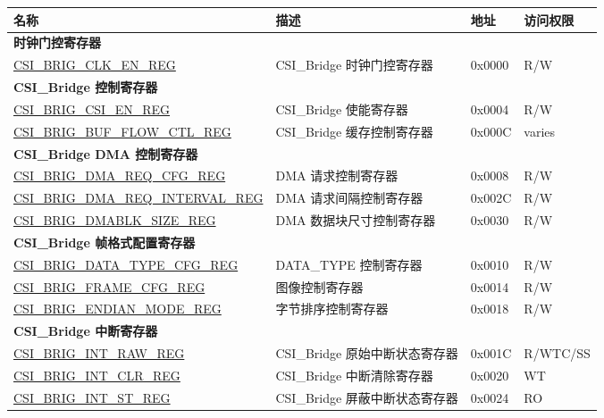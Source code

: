 \begin{longtable}{ | p{6cm} | p{7.2cm} | p{1.3cm} | p{1cm} | }
\hline\rowcolor{lightgray}
\textbf{名称} & \textbf{描述} &  \textbf{地址} & \textbf{访问权限} \\ \hline
\endhead
\multicolumn{4}{|l|}{\textbf{时钟门控寄存器}} \\ \hline
\hyperref[regdesc:CSIBRIGCLKENREG]{CSI\_BRIG\_CLK\_EN\_REG} & CSI\_Bridge 时钟门控寄存器 & 0x0000 & R/W \\ \hline

\multicolumn{4}{|l|}{\textbf{CSI\_Bridge 控制寄存器}} \\ \hline
\hyperref[regdesc:CSIBRIGCSIENREG]{CSI\_BRIG\_CSI\_EN\_REG} & CSI\_Bridge 使能寄存器 & 0x0004 & R/W \\ \hline
\hyperref[regdesc:CSIBRIGBUFFLOWCTLREG]{CSI\_BRIG\_BUF\_FLOW\_CTL\_REG} & CSI\_Bridge 缓存控制寄存器 & 0x000C & varies \\ \hline
\multicolumn{4}{|l|}{\textbf{CSI\_Bridge DMA 控制寄存器}} \\ \hline
\hyperref[regdesc:CSIBRIGDMAREQCFGREG]{CSI\_BRIG\_DMA\_REQ\_CFG\_REG} & DMA 请求控制寄存器 & 0x0008 & R/W \\ \hline
\hyperref[regdesc:CSIBRIGDMAREQINTERVALREG]{CSI\_BRIG\_DMA\_REQ\_INTERVAL\_REG} & DMA 请求间隔控制寄存器 & 0x002C & R/W \\ \hline
\hyperref[regdesc:CSIBRIGDMABLKSIZEREG]{CSI\_BRIG\_DMABLK\_SIZE\_REG} & DMA 数据块尺寸控制寄存器 & 0x0030 & R/W \\ \hline
\multicolumn{4}{|l|}{\textbf{CSI\_Bridge 帧格式配置寄存器}} \\ \hline
\hyperref[regdesc:CSIBRIGDATATYPECFGREG]{CSI\_BRIG\_DATA\_TYPE\_CFG\_REG} & DATA\_TYPE 控制寄存器 & 0x0010 & R/W \\ \hline
\hyperref[regdesc:CSIBRIGFRAMECFGREG]{CSI\_BRIG\_FRAME\_CFG\_REG} & 图像控制寄存器 & 0x0014 & R/W \\ \hline
\hyperref[regdesc:CSIBRIGENDIANMODEREG]{CSI\_BRIG\_ENDIAN\_MODE\_REG} & 字节排序控制寄存器 & 0x0018 & R/W \\ \hline
\multicolumn{4}{|l|}{\textbf{CSI\_Bridge 中断寄存器}} \\ \hline
\hyperref[regdesc:CSIBRIGINTRAWREG]{CSI\_BRIG\_INT\_RAW\_REG} & CSI\_Bridge 原始中断状态寄存器 & 0x001C & R/WTC/SS \\ \hline
\hyperref[regdesc:CSIBRIGINTCLRREG]{CSI\_BRIG\_INT\_CLR\_REG} & CSI\_Bridge 中断清除寄存器 & 0x0020 & WT \\ \hline
\hyperref[regdesc:CSIBRIGINTSTREG]{CSI\_BRIG\_INT\_ST\_REG} & CSI\_Bridge 屏蔽中断状态寄存器 & 0x0024 & RO \\ \hline

\end{longtable}
